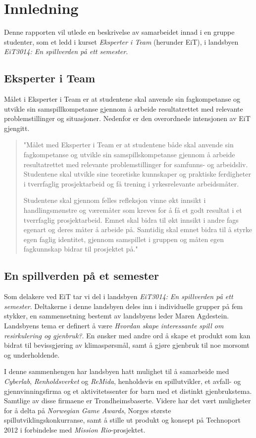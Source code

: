 \section{Innledning}
Denne rapporten vil utlede en beskrivelse av samarbeidet innad i en gruppe studenter, som et ledd i kurset \emph{Eksperter i Team} (herunder EiT), i landsbyen \emph{EiT3014: En spillverden på ett semester}.

\subsection{Eksperter i Team} Målet i Eksperter i Team er at studentene
skal anvende sin fagkompetanse og utvikle sin samspillkompetanse gjennom
å arbeide resultatrettet med relevante problemstillinger og situasjoner.
Nedenfor er den overordnede intensjonen av EiT gjengitt.

\begin{quotation}"Målet med Eksperter i Team er at studentene både skal anvende
sin fagkompetanse og utvikle sin samspillskompetanse gjennom å arbeide
resultatrettet med relevante problemstillinger for samfunns- og
arbeidsliv. Studentene skal utvikle sine teoretiske kunnskaper og
praktiske ferdigheter i tverrfaglig prosjektarbeid og få trening i
yrkesrelevante arbeidsmåter.

Studentene skal gjennom felles refleksjon vinne økt innsikt i
handlingsmønstre og væremåter som kreves for å få et godt resultat i et
tverrfaglig prosjektarbeid. Emnet skal bidra til økt innsikt i andre
fags egenart og deres måter å arbeide på. Samtidig skal emnet bidra til
å styrke egen faglig identitet, gjennom samspillet i gruppen og måten
egen fagkunnskap bidrar til prosjektet på."
\end{quotation}

\subsection{En spillverden på et semester} Som delakere ved EiT tar vi
del i landsbyen \emph{EiT3014: En spillverden på ett semester}.
Deltakerne i denne landsbyen deles inn i individuelle grupper på fem
stykker, en sammensetning bestemt av landsbyens leder Maren Agdestein.
Landsbyens tema er definert å være \emph{Hvordan skape interessante
spill om resirkulering og gjenbruk?}. En ønsker med andre ord å skape et
produkt som kan bidrat til bevissgjøring av klimaspørsmål, samt å gjøre
gjenbruk til noe morsomt og underholdende.

I denne sammenhengen har landsbyen hatt mulighet til å samarbeide med
\emph{Cyberlab}, \emph{Renholdsverket} og \emph{ReMida}, henholdsvis en
spillutvikler, et avfall- og gjennvinningsfirma og et aktivitetssenter
for barn med et distinkt gjenbrukstema. Samtlige av disse firmaene er
Trondheimsbaserte. Videre har det vært muligheter for å delta på
\emph{Norwegian Game Awards}, Norges største spillutviklingskonkurranse,
samt å stille ut produkt og konsept på Technoport 2012 i forbindelse med
\emph{Mission Rio}-prosjektet.

